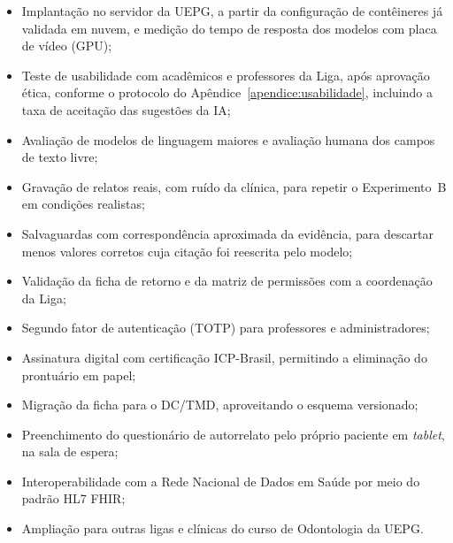 \begin{itemize}
	\item Implantação no servidor da UEPG, a partir da configuração de contêineres já validada em nuvem, e medição do tempo de resposta dos modelos com placa de vídeo (GPU);
	\item Teste de usabilidade com acadêmicos e professores da Liga, após aprovação ética, conforme o protocolo do Apêndice~\ref{apendice:usabilidade}, incluindo a taxa de aceitação das sugestões da IA;
	\item Avaliação de modelos de linguagem maiores e avaliação humana dos campos de texto livre;
	\item Gravação de relatos reais, com ruído da clínica, para repetir o Experimento~B em condições realistas;
	\item Salvaguardas com correspondência aproximada da evidência, para descartar menos valores corretos cuja citação foi reescrita pelo modelo;
	\item Validação da ficha de retorno e da matriz de permissões com a coordenação da Liga;
	\item Segundo fator de autenticação (TOTP) para professores e administradores;
	\item Assinatura digital com certificação ICP-Brasil, permitindo a eliminação do prontuário em papel;
	\item Migração da ficha para o DC/TMD, aproveitando o esquema versionado;
	\item Preenchimento do questionário de autorrelato pelo próprio paciente em \textit{tablet}, na sala de espera;
	\item Interoperabilidade com a Rede Nacional de Dados em Saúde por meio do padrão HL7 FHIR;
	\item Ampliação para outras ligas e clínicas do curso de Odontologia da UEPG.
\end{itemize}
